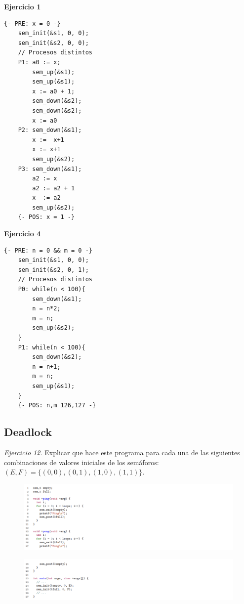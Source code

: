 \documentclass[12pt]{article}
\begin{document}
\begin{rta}
    \textbf{Ejercicio 1}
    \begin{lstlisting}[style=CStyle]
    {- PRE: x = 0 -}
    sem_init(&s1, 0, 0);
    sem_init(&s2, 0, 0);
    // Procesos distintos
    P1: a0 := x;
        sem_up(&s1);
        sem_up(&s1);
        x := a0 + 1;
        sem_down(&s2);
        sem_down(&s2);
        x := a0
    P2: sem_down(&s1);
        x :=  x+1
        x := x+1
        sem_up(&s2);
    P3: sem_down(&s1);
        a2 := x
        a2 := a2 + 1
        x  := a2
        sem_up(&s2);
    {- POS: x = 1 -}
    \end{lstlisting}
    \textbf{Ejercicio 4}
    \begin{lstlisting}[style=CStyle]
    {- PRE: n = 0 && m = 0 -}
    sem_init(&s1, 0, 0);
    sem_init(&s2, 0, 1);
    // Procesos distintos
    P0: while(n < 100){
        sem_down(&s1);
        n = n*2;
        m = n;
        sem_up(&s2);
    }
    P1: while(n < 100){
        sem_down(&s2);
        n = n+1;
        m = n;
        sem_up(&s1);
    }
    {- POS: n,m 126,127 -}
    \end{lstlisting}
\end{rta}

\subsection*{Deadlock}
\newpage
\noindent \textit{Ejercicio 12.} Explicar que hace este programa para cada una de las siguientes combinaciones de valores iniciales de los semáforos: $(E, F)=\{(0,0),(0,1),(1,0),(1,1)\}$.

\begin{figure}[h]
    \centering
    \includegraphics[width=1\textwidth]{c9.png}
\end{figure}
\begin{figure}[h]
    \centering
    \includegraphics[width=1\textwidth]{c10.png}
\end{figure}
\end{document}
